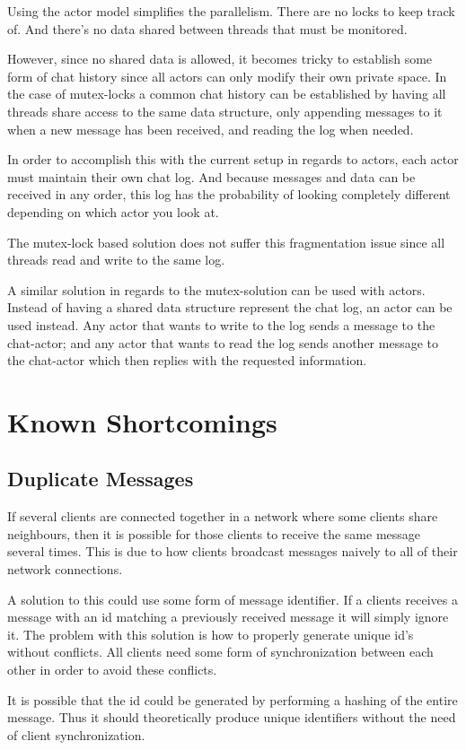 Using the actor model simplifies the parallelism. There are no locks to keep track of. And there's no data shared between threads that must be monitored.

However, since no shared data is allowed, it becomes tricky to establish some form of chat history since all actors can only modify their own private space. In the case of mutex-locks a common chat history can be established by having all threads share access to the same data structure, only appending messages to it when a new message has been received, and reading the log when needed.

In order to accomplish this with the current setup in regards to actors, each actor must maintain their own chat log. And because messages and data can be received in any order, this log has the probability of looking completely different depending on which actor you look at.

The mutex-lock based solution does not suffer this fragmentation issue since all threads read and write to the same log.

A similar solution in regards to the mutex-solution can be used with actors. Instead of having a shared data structure represent the chat log, an actor can be used instead. Any actor that wants to write to the log sends a message to the chat-actor; and any actor that wants to read the log sends another message to the chat-actor which then replies with the requested information.

\section{Known Shortcomings}
\subsection{Duplicate Messages}
If several clients are connected together in a network where some clients share neighbours, then it is possible for those clients to receive the same message several times. This is due to how clients broadcast messages naively to all of their network connections.

A solution to this could use some form of message identifier. If a clients receives a message with an id matching a previously received message it will simply ignore it. The problem with this solution is how to properly generate unique id's without conflicts. All clients need some form of synchronization between each other in order to avoid these conflicts.

It is possible that the id could be generated by performing a hashing of the entire message. Thus it should theoretically produce unique identifiers without the need of client synchronization.
